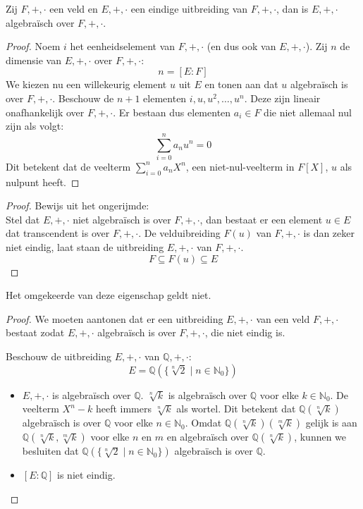 \documentclass[main.tex]{subfiles}
\begin{document}
\begin{pr}
  \examen
  \label{st:uitbreiding-eindig-dan-algebraisch}
  Zij $F,+,\cdot$ een veld en $E,+,\cdot$ een eindige uitbreiding van $F,+,\cdot$, dan is $E,+,\cdot$ algebra\"isch over $F,+,\cdot$.

  \begin{proof}
    Noem $i$ het eenheidselement van $F,+,\cdot$ (en dus ook van $E,+,\cdot$).
    Zij $n$ de dimensie van $E,+,\cdot$ over $F,+,\cdot$:
    \[ n = [E:F] \]
    We kiezen nu een willekeurig element $u$ uit $E$ en tonen aan dat $u$ algebra\"isch is over $F,+,\cdot$.
    Beschouw de $n+1$ elementen $i,u,u^{2},\dotsc,u^{n}$.
    Deze zijn lineair onafhankelijk over $F,+,\cdot$.\waarom
    Er bestaan dus elementen $a_{i}\in F$ die niet allemaal nul zijn als volgt:
    \[ \sum_{i=0}^{n}a_{n}u^{n} = 0 \]
    Dit betekent dat de veelterm $\sum_{i=0}^{n}a_{n}X^{n}$, een niet-nul-veelterm in $F[X]$, $u$ als nulpunt heeft.
  \end{proof}
  \begin{proof}
    Bewijs uit het ongerijmde:\\
    Stel dat $E,+,\cdot$ niet algebra\"isch is over $F,+,\cdot$, dan bestaat er een element $u\in E$ dat transcendent is over $F,+,\cdot$.
    De velduibreiding $F(u)$ van $F,+,\cdot$ is dan zeker niet eindig, laat staan de uitbreiding $E,+,\cdot$ van $F,+,\cdot$.
    \[ F \subseteq F(u) \subseteq E \]
  \end{proof}
\end{pr}

\begin{tvb}
  \examen
  Het omgekeerde van deze eigenschap geldt niet.
  
  \begin{proof}
    We moeten aantonen dat er een uitbreiding $E,+,\cdot$ van een veld $F,+,\cdot$ bestaat zodat $E,+,\cdot$ algebra\"isch is over $F,+,\cdot$, die niet eindig is.

    Beschouw de uitbreiding $E,+,\cdot$ van $\mathbb{Q},+,\cdot$:
    \[ E = \mathbb{Q}(\{\sqrt[n]{2} \mid n\in \mathbb{N}_{0}\}) \]
    \begin{itemize}
    \item $E,+,\cdot$ is algebra\"isch over $\mathbb{Q}$.
      $\sqrt[n]{k}$ is algebra\"isch over $\mathbb{Q}$ voor elke $k\in \mathbb{N}_{0}$.
      De veelterm $X^{n}-k$ heeft immers $\sqrt[n]{k}$ als wortel.
      Dit betekent dat $\mathbb{Q}(\sqrt[n]{k})$ algebra\"isch is over $\mathbb{Q}$ voor elke $n\in \mathbb{N}_{0}$. Omdat $\mathbb{Q}(\sqrt[n]{k})(\sqrt[m]{k})$ gelijk is aan  $\mathbb{Q}(\sqrt[n]{k},\sqrt[m]{k})$ voor elke $n$ en $m$ en algebra\"isch over $\mathbb{Q}(\sqrt[n]{k})$, kunnen we besluiten dat $\mathbb{Q}(\{\sqrt[n]{2} \mid n\in \mathbb{N}_{0}\})$ algebra\"isch is over $\mathbb{Q}$. 
    \item $[E:\mathbb{Q}]$ is niet eindig.
    \end{itemize}
  \end{proof}
\end{tvb}
\end{document}
